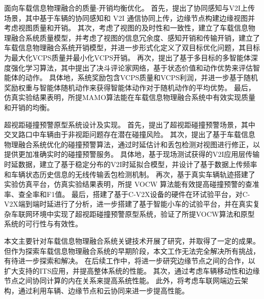  面向车载信息物理融合的质量-开销均衡优化。
首先，提出了协同感知与V2I上传场景，其中基于车辆的协同感知和 V2I 通信协同上传，边缘节点构建边缘视图并考虑视图质量和开销。
其次，考虑了视图的及时性和一致性，建立了车载信息物理融合系统质量模型，并考虑了视图的信息冗余度、感知开销和传输开销，建立了车载信息物理融合系统开销模型，并进一步形式化定义了双目标优化问题，其目标为最大化VCPS质量并最小化VCPS开销。
再次，提出了基于多目标的多智能体深度强化学习算法，其中提出了决斗评论家网络，基于状态价值和动作优势来评估智能体的动作。
具体地，系统奖励包含VCPS质量和VCPS利润，并进一步基于随机奖励权重与智能体随机动作来获得智能体动作对于随机动作的平均优势。
最后，仿真实验结果表明，所提MAMO算法能在车载信息物理融合系统中有效实现质量和开销的均衡。

 超视距碰撞预警原型系统设计及实现。
首先，提出了超视距碰撞预警场景，其中交叉路口中车辆由于非视距问题存在潜在碰撞风险。
其次，提出了基于车载信息物理融合系统优化的碰撞预警算法，通过时延估计和丢包检测对视图进行修正，以提供更加准确实时的碰撞预警服务。
具体地，基于现场测试获得的V2I应用层传输时延数据，建立了基于稳定分布的V2I时延拟合模型，并设计了基于数据上传频率和车辆状态历史信息的无线传输丢包检测机制。
再次，基于真实车辆轨迹搭建了实验仿真平台，仿真实验结果表明，所提 VOCW 算法能有效提高碰撞预警的查准率、查全率和F1值。
最后，搭建了基于C-V2X设备的硬件在环试验平台，对C-V2X端到端时延进行了分析，进一步搭建了基于智能小车的试验平台，并在真实复杂车联网环境中实现了超视距碰撞预警原型系统，验证了所提VOCW算法和原型系统的可行性与有效性。

本文主要针对车载信息物理融合系统关键技术开展了研究，并取得了一定的成果。
但作为探索车载信息物理融合系统的早期阶段，本文工作无法完全解决所有挑战，有待进一步探索和解决。
在后续工作中，将进一步研究边缘节点之间的合作，以扩大支持的ITS应用，并提高整体系统的性能。
其次，通过考虑车辆移动性和边缘节点之间协同计算的内在关系来提高系统性能。
此外，将考虑车联网端边云架构，通过利用车辆、边缘节点和云协同来进一步提高性能。
